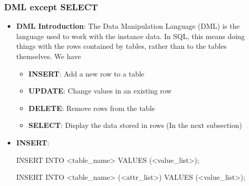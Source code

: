 \documentclass{report}
\begin{document}
    \subsubsection{DML except SELECT}
    \begin{itemize}
        \item \textbf{DML Introduction}: The Data Manipulation Language (DML) is the language used to work with the instance data. In SQL, this means doing things with the rows contained by tables, rather than to the tables themselves. We have
            \begin{itemize}
                \item \textbf{INSERT}: Add a new row to a table
                \item \textbf{UPDATE}: Change values in an existing row
                \item \textbf{DELETE}: Remove rows from the table
                \item \textbf{SELECT}: Display the data stored in rows (In the next subsection)
            \end{itemize}
        \item \textbf{INSERT}:
            \begin{sqlcode}
                INSERT INTO <table_name>
                    VALUES (<value_list>);

                INSERT INTO <table_name>
                    (<attr_list>)
                    VALUES (<value_list>);


\end{sqlcode}
\end{itemize}
\end{document}
